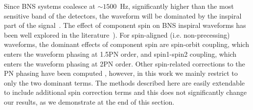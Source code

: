 Since BNS systems coalesce at $\sim 1500$~Hz, significantly higher than the
most sensitive band of the detectors, the waveform will be dominated by the
inspiral part of the signal~\cite{Buonanno:2009zt}.  The effect of component
spin on BNS inspiral waveforms has been well explored in the
literature~\cite{Apostolatos:1994mx,Kidder:1992fr,Kidder:1995zr,BCV03b}).
For spin-aligned (i.e. non-precessing) waveforms, the dominant effects of
component spin are spin-orbit coupling, which enters the waveform phasing at
1.5PN order, and spin1-spin2 coupling, which enters the waveform phasing at
2PN order.  Other spin-related corrections to the PN phasing have been
computed \cite{Mikoczi:2005dn,Arun:2008kb}, however, in this work we mainly restrict
to only the two dominant terms. The methods described here are easily
extendable to include additional spin correction terms and this does not
significantly change our results, as we demonstrate at the end of this section.

